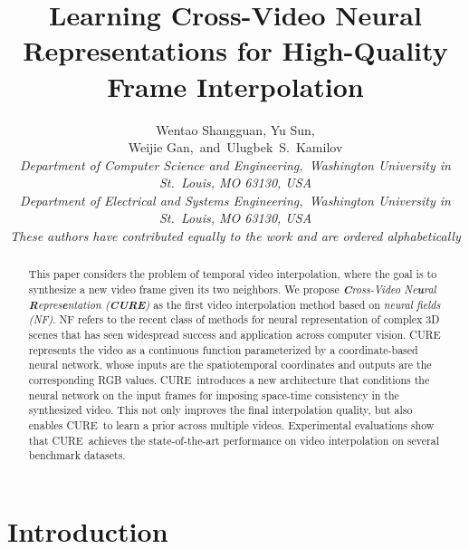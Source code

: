 \documentclass[12pt]{article}
\def\proposed{CURE}
\begin{document}
\title{Learning Cross-Video Neural Representations for High-Quality Frame Interpolation}

\author{
Wentao Shangguan, Yu Sun, \\
Weijie Gan,~and~Ulugbek~S.~Kamilov\\
\emph{\footnotesize Department of Computer Science and Engineering,~Washington University in St.~Louis, MO 63130, USA}\\
\emph{\footnotesize Department of Electrical and Systems Engineering,~Washington University in St.~Louis, MO 63130, USA}\\
\footnotesize\emph{These authors have contributed equally to the work and are ordered alphabetically}
}

\date{}

\maketitle 

\begin{abstract}
This paper considers the problem of temporal video interpolation, where the goal is to synthesize a new video frame given its two neighbors. We propose \emph{\textbf{C}ross-Video Ne\textbf{u}ral \textbf{R}epres\textbf{e}ntation (\textbf{CURE})} as the first video interpolation method based on \emph{neural fields (NF)}. NF refers to the recent class of methods for neural representation of complex 3D scenes that has seen widespread success and application across computer vision. CURE represents the video as a continuous function parameterized by a coordinate-based neural network, whose inputs are the spatiotemporal coordinates and outputs are the corresponding RGB values.  \proposed~introduces a new architecture that conditions the neural network on the input frames for imposing space-time consistency in the synthesized video. This not only improves the final interpolation quality, but also enables \proposed~to learn a prior across multiple videos. Experimental evaluations show that \proposed~achieves the state-of-the-art performance on video interpolation on several benchmark datasets.
\end{abstract}

\section{Introduction}
\end{document}
